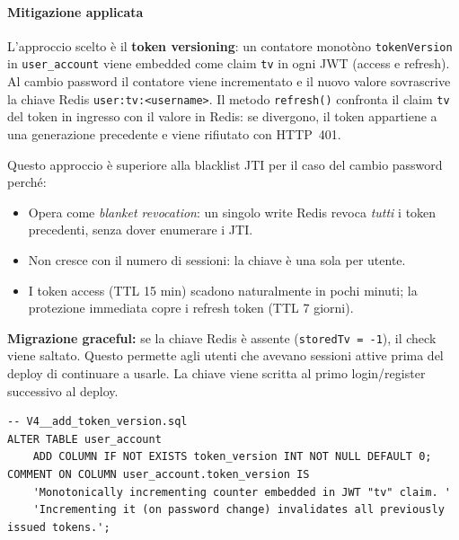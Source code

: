 ﻿\documentclass[a4paper,12pt]{report}
\begin{document}
\paragraph{Mitigazione applicata}
L'approccio scelto è il \textbf{token versioning}: un contatore monotòno \texttt{tokenVersion}
in \texttt{user\_account} viene embedded come claim \texttt{tv} in ogni JWT (access
e refresh). Al cambio password il contatore viene incrementato e il nuovo valore
sovrascrive la chiave Redis \texttt{user:tv:<username>}. Il metodo \texttt{refresh()}
confronta il claim \texttt{tv} del token in ingresso con il valore in Redis: se
divergono, il token appartiene a una generazione precedente e viene rifiutato con
HTTP~401.

\noindent Questo approccio è superiore alla blacklist JTI per il caso del cambio
password perché:
\begin{itemize}
  \item Opera come \emph{blanket revocation}: un singolo write Redis revoca
        \emph{tutti} i token precedenti, senza dover enumerare i JTI.
  \item Non cresce con il numero di sessioni: la chiave è una sola per utente.
  \item I token access (TTL 15 min) scadono naturalmente in pochi minuti;
        la protezione immediata copre i refresh token (TTL 7 giorni).
\end{itemize}

\noindent\textbf{Migrazione graceful:} se la chiave Redis è assente
(\texttt{storedTv = -1}), il check viene saltato. Questo permette agli utenti
che avevano sessioni attive prima del deploy di continuare a usarle.
La chiave viene scritta al primo login/register successivo al deploy.

\begin{securebox}[title={Codice Sicuro --- Flyway V4 (migrazione schema)}]
\begin{lstlisting}[style=sql]
-- V4__add_token_version.sql
ALTER TABLE user_account
    ADD COLUMN IF NOT EXISTS token_version INT NOT NULL DEFAULT 0;
COMMENT ON COLUMN user_account.token_version IS
    'Monotonically incrementing counter embedded in JWT "tv" claim. '
    'Incrementing it (on password change) invalidates all previously issued tokens.';
\end{lstlisting}
\end{securebox}
\end{document}

